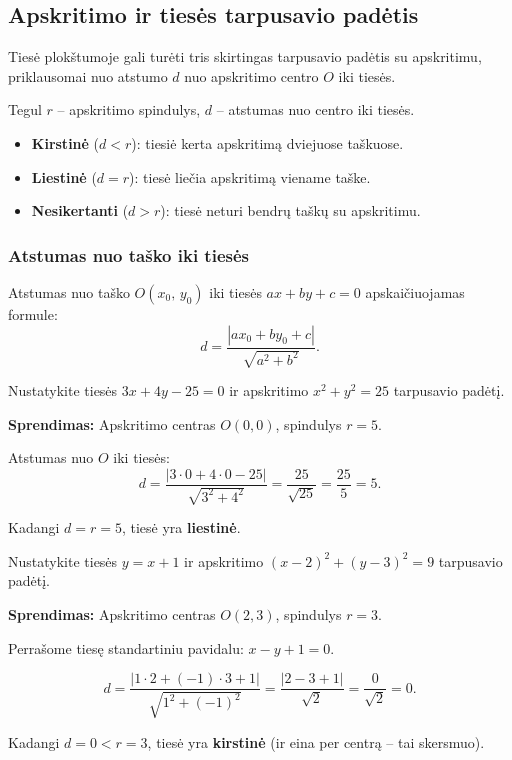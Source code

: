 \subsection{Apskritimo ir tiesės tarpusavio padėtis}

Tiesė plokštumoje gali turėti tris skirtingas tarpusavio padėtis su apskritimu, priklausomai nuo atstumo $d$ nuo apskritimo centro $O$ iki tiesės.

\begin{tcolorbox}[colback=yellow!10!white, colframe=orange!80!black, title=Tiesės ir apskritimo padėtys]
Tegul $r$ – apskritimo spindulys, $d$ – atstumas nuo centro iki tiesės.
\begin{itemize}
  \item \textbf{Kirstinė} ($d < r$): tiesiė kerta apskritimą dviejuose taškuose.
  \item \textbf{Liestinė} ($d = r$): tiesė liečia apskritimą viename taške.
  \item \textbf{Nesikertanti} ($d > r$): tiesė neturi bendrų taškų su apskritimu.
\end{itemize}
\end{tcolorbox}

\subsubsection*{Atstumas nuo taško iki tiesės}

Atstumas nuo taško $O(x_0,\, y_0)$ iki tiesės $ax + by + c = 0$ apskaičiuojamas formule:
\[
d = \frac{|ax_0 + by_0 + c|}{\sqrt{a^2 + b^2}}.
\]

\begin{example}
Nustatykite tiesės $3x + 4y - 25 = 0$ ir apskritimo $x^2 + y^2 = 25$ tarpusavio padėtį.

\textbf{Sprendimas:} Apskritimo centras $O(0, 0)$, spindulys $r = 5$.

Atstumas nuo $O$ iki tiesės:
\[
d = \frac{|3\cdot 0 + 4\cdot 0 - 25|}{\sqrt{3^2 + 4^2}} = \frac{25}{\sqrt{25}} = \frac{25}{5} = 5.
\]

Kadangi $d = r = 5$, tiesė yra \textbf{liestinė}.
\end{example}

\begin{example}
Nustatykite tiesės $y = x + 1$ ir apskritimo $(x-2)^2 + (y-3)^2 = 9$ tarpusavio padėtį.

\textbf{Sprendimas:} Apskritimo centras $O(2, 3)$, spindulys $r = 3$.

Perrašome tiesę standartiniu pavidalu: $x - y + 1 = 0$.

\[
d = \frac{|1\cdot 2 + (-1)\cdot 3 + 1|}{\sqrt{1^2 + (-1)^2}} = \frac{|2 - 3 + 1|}{\sqrt{2}} = \frac{0}{\sqrt{2}} = 0.
\]

Kadangi $d = 0 < r = 3$, tiesė yra \textbf{kirstinė} (ir eina per centrą – tai skersmuo).
\end{example}

